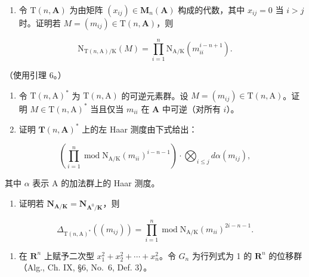 \begin{enumerate}
\def\labelenumi{\alph{enumi})}
\tightlist
\item
  令 \(\mathrm{T}(n, \mathbf{A})\) 为由矩阵 \((x_{ij}) \in \mathbf{M}_n(\mathbf{A})\) 构成的代数，其中 \(x_{ij} = 0\) 当 \(i > j\) 时。证明若 \(M = (m_{ij}) \in \mathrm{T}(n, \mathbf{A})\)，则
\end{enumerate}

\[
\mathrm{N} _ {\mathrm{T} (n, \mathrm{A}) / \mathrm{K}} (M) = \prod_ {i = 1} ^ {n} \mathrm{N} _ {\mathrm{A} / \mathrm{K}} (m _ {i i} ^ {i - n + 1}).
\]

（使用引理 6。）

\begin{enumerate}
\def\labelenumi{\alph{enumi})}
\setcounter{enumi}{1}
\item
  令 \(\mathrm{T}(n,\mathrm{A})^*\) 为 \(\mathrm{T}(n,\mathrm{A})\) 的可逆元素群。设 \(M = (m_{ij}) \in \mathrm{T}(n,\mathrm{A})\)。证明 \(M \in \mathrm{T}(n,\mathrm{A})^*\) 当且仅当 \(m_{ii}\) 在 \(\mathbf{A}\) 中可逆（对所有 \(i\)）。
\item
  证明 \(\mathbf{T}(n,\mathbf{A})^{*}\) 上的左 Haar 测度由下式给出：
\end{enumerate}

\[
\left(\prod_ {i = 1} ^ {n} \operatorname{mod} \mathrm{N} _ {\mathrm{A} / \mathrm{K}} (m _ {i i}) ^ {i - n - 1}\right) \cdot \bigotimes_ {i \leqslant j} d \alpha (m _ {i j}),
\]

其中 \(\alpha\) 表示 A 的加法群上的 Haar 测度。

\begin{enumerate}
\def\labelenumi{\alph{enumi})}
\setcounter{enumi}{3}
\tightlist
\item
  证明若 \(\mathbf{N}_{\mathbf{A} / \mathbf{K}} = \mathbf{N}_{\mathbf{A}^0 /\mathbf{K}}\)，则
\end{enumerate}

\[
\Delta_ {\mathrm{T} (n, \mathrm{A}) ^ {*}} \left(\left(m _ {i j}\right)\right) = \prod_ {i = 1} ^ {n} \operatorname{mod} \mathrm{N} _ {\mathrm{A} / \mathrm{K}} \left(m _ {i i}\right) ^ {2 i - n - 1}.
\]

\begin{enumerate}
\def\labelenumi{\arabic{enumi})}
\setcounter{enumi}{4}
\tightlist
\item
  在 \(\mathbf{R}^{n}\) 上赋予二次型 \(x_{1}^{2} + x_{2}^{2} + \cdots + x_{n}^{2}\)。令 \(G_{n}\) 为行列式为 1 的 \(\mathbf{R}^{n}\) 的位移群（Alg., Ch. IX, §6, No.~6, Def. 3）。
\end{enumerate}

